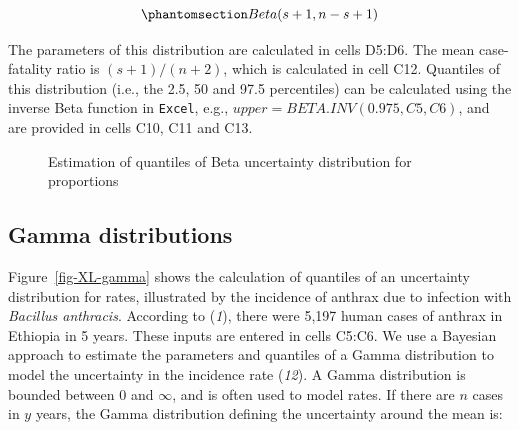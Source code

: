 \documentclass[
  letterpaper,
  DIV=11,
  numbers=noendperiod]{scrartcl}
\begin{document}
\begin{equation}\phantomsection\label{eq-beta}{
Beta(s+1, n-s+1)
}\end{equation}

The parameters of this distribution are calculated in cells D5:D6. The
mean case-fatality ratio is \((s+1)/(n+2)\), which is calculated in cell
C12. Quantiles of this distribution (i.e., the 2.5, 50 and 97.5
percentiles) can be calculated using the inverse Beta function in
\texttt{Excel}, e.g., \(upper=BETA.INV(0.975,C5,C6)\), and are provided
in cells C10, C11 and C13.

\begin{figure}


\caption{\label{fig-XL-beta}Estimation of quantiles of Beta uncertainty
distribution for proportions}

\end{figure}%

\subsection{Gamma distributions}\label{gamma-distributions}

Figure~\ref{fig-XL-gamma} shows the calculation of quantiles of an
uncertainty distribution for rates, illustrated by the incidence of
anthrax due to infection with \emph{Bacillus anthracis}. According to
(\emph{1}), there were 5,197 human cases of anthrax in Ethiopia in 5
years. These inputs are entered in cells C5:C6. We use a Bayesian
approach to estimate the parameters and quantiles of a Gamma
distribution to model the uncertainty in the incidence rate (\emph{12}).
A Gamma distribution is bounded between 0 and \(\infty\), and is often
used to model rates. If there are \(n\) cases in \(y\) years, the Gamma
distribution defining the uncertainty around the mean is:
\end{document}
